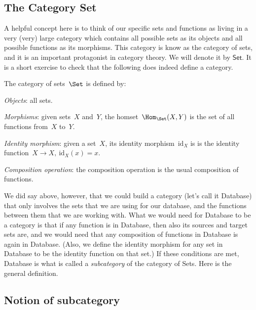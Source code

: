 \subsection{The Category Set}

A helpful concept here is to think of our specific sets and functions as living in a very (very) large category which contains all possible sets as its objects and all possible functions as its morphisms. This category is know as the category of sets, and it is an important protagonist in category theory. We will denote it by $\textsf{Set}$. It is a short exercise to check that the following does indeed define a category.

\begin{shaded*}
\begin{definition}
The category of sets~$\Set$ is defined by:
    \begin{compactenum}
    \item \emph{Objects}: all sets.
    \item \emph{Morphisms}: given sets~$X$ and~$Y$, the homset~$\Hom_\Set(X,Y)$ is the set of all functions from~$X$ to~$Y$.
    \item \emph{Identity morphism}: given a set~$X$, its identity morphism~$\text{id}_X$ is
    is the identity function~$X \to X, \ \text{id}_X(x) = x$.
    \item \emph{Composition operation}: the composition operation is the usual composition of functions.
    \end{compactenum}
\end{definition}
\end{shaded*}



We did say above, however, that we could build a category (let's call it \textsf{Database}) that only involves the sets that we are using for our database, and the functions between them that we are working with. What we would need for \textsf{Database} to be a category is that if any function is in \textsf{Database}, then also its sources and target sets are, and we would need that any composition of functions in \textsf{Database} is again in \textsf{Database}. (Also, we define the identity morphism for any set in \textsf{Database} to be the identity function on that set.) If these conditions are met, \textsf{Database} is what is called a \emph{subcategory} of the category of Sets. Here is the general definition. 


\subsection{Notion of subcategory}

